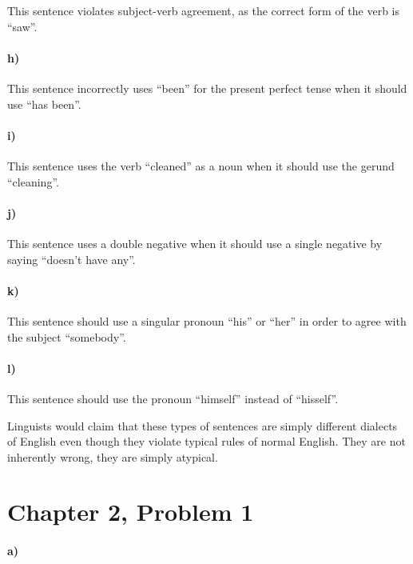 \documentclass[12pt]{article}
\begin{document}
This sentence violates subject-verb agreement, as the correct form of the verb is ``saw''.

\paragraph{h)}

This sentence incorrectly uses ``been'' for the present perfect tense when it should use ``has been''.

\paragraph{i)}

This sentence uses the verb ``cleaned'' as a noun when it should use the gerund ``cleaning''.

\paragraph{j)}

This sentence uses a double negative when it should use a single negative by saying ``doesn't have any''.

\paragraph{k)}

This sentence should use a singular pronoun ``his'' or ``her'' in order to agree with the subject ``somebody''.

\paragraph{l)}

This sentence should use the pronoun ``himself'' instead of ``hisself''.

Linguists would claim that these types of sentences are simply different dialects of English even though they violate
typical rules of normal English. They are not inherently wrong, they are simply atypical.

\section*{Chapter 2, Problem 1}

\paragraph{a)}
\end{document}
